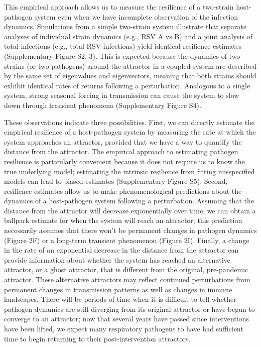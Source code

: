 \documentclass[12pt]{article}
\begin{document}
This empirical approach allows us to measure the resilience of a two-strain host-pathogen system even when we have incomplete observation of the infection dynamics.
Simulations from a simple two-strain system illustrate that separate analyses of individual strain dynamics (e.g., RSV A vs B) and a joint analysis of total infections (e.g., total RSV infections) yield identical resilience estimates (Supplementary Figure S2, 3).
This is expected because the dynamics of two strains (or two pathogens) around the attractor in a coupled system are described by the same set of eigenvalues and eigenvectors, meaning that both strains should exhibit identical rates of returns following a perturbation.
Analogous to a single system, strong seasonal forcing in transmission can cause the system to slow down through transient phenomena (Supplementary Figure S4).

These observations indicate three possibilities.
First, we can directly estimate the empirical resilience of a host-pathogen system by measuring the rate at which the system approaches an attractor, provided that we have a way to quantify the distance from the attractor.
The empirical approach to estimating pathogen resilience is particularly convenient because it does not require us to know the true underlying model;
estimating the intrinsic resilience from fitting misspecified models can lead to biased estimates (Supplementary Figure S5).
Second, resilience estimates allow us to make phenomenological predictions about the dynamics of a host-pathogen system following a perturbation.
Assuming that the distance from the attractor will decrease exponentially over time, we can obtain a ballpark estimate for when the system will reach an attractor;
this prediction necessarily assumes that there won't be permanent changes in pathogen dynamics (Figure 2F) or a long-term transient phenomenon (Figure 2I).
Finally, a change in the rate of an exponential decrease in the distance from the attractor can provide information about whether the system has reached an alternative attractor, or a ghost attractor, that is different from the original, pre-pandemic attractor.
These alternative attractors may reflect continued perturbations from permanent changes in transmission patterns as well as changes in immune landscapes.
There will be periods of time when it is difficult to tell whether pathogen dynamics are still diverging from its original attractor or have begun to converge to an attractor; 
now that several years have passed since interventions have been lifted, we expect many respiratory pathogens to have had sufficient time to begin returning to their post-intervention attractors.
\end{document}
